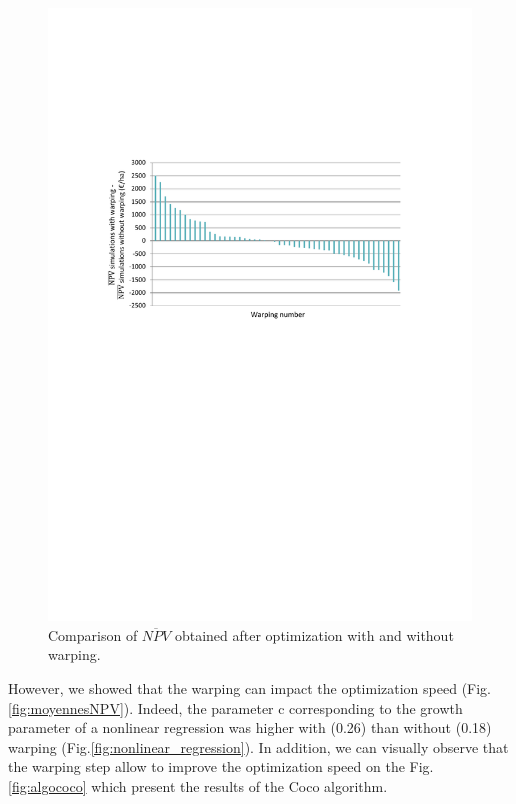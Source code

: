 \begin{figure}[!ht]
	\centering
	\includegraphics[trim = 0cm 11cm 0cm 6cm, clip]{Figures_Warping_resultats_warping_moins_sanswarping.pdf}
	\caption{Comparison of $\overline{NPV}$ obtained after optimization with and without warping. }\label{fig:waping_moins_sanswarping}
\end{figure}

However, we showed that the warping can impact the optimization speed (Fig.\ref{fig:moyennesNPV}). Indeed, the parameter c corresponding to the growth parameter of a nonlinear regression was higher with (0.26) than without (0.18) warping (Fig.\ref{fig:nonlinear_regression}). In addition, we can visually observe that the warping step allow to improve the optimization speed on the Fig.\ref{fig:algococo} which present the results of the Coco algorithm.

